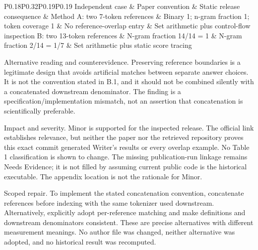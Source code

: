\documentclass[10pt]{article}
\begin{document}
P0.18P0.32P0.19P0.19 Independent case \& Paper convention \& Static release consequence \& Method
A: two 7-token references \& Binary 1; n-gram fraction 1; token coverage 1 \& No reference-overlap entry \& Set arithmetic plus control-flow inspection
B: two 13-token references \& N-gram fraction 14/14 = 1 \& N-gram fraction 2/14 = 1/7 \& Set arithmetic plus static score tracing\par
Alternative reading and counterevidence. Preserving reference boundaries is a legitimate design that avoids artificial matches between separate answer choices. It is not the convention stated in B.1, and it should not be combined silently with a concatenated downstream denominator. The finding is a specification/implementation mismatch, not an assertion that concatenation is scientifically preferable.\par
Impact and severity. Minor is supported for the inspected release. The official link establishes relevance, but neither the paper nor the retrieved repository proves this exact commit generated Writer’s results or every overlap example. No Table 1 classification is shown to change. The missing publication-run linkage remains Needs Evidence; it is not filled by assuming current public code is the historical executable. The appendix location is not the rationale for Minor.\par
Scoped repair. To implement the stated concatenation convention, concatenate references before indexing with the same tokenizer used downstream. Alternatively, explicitly adopt per-reference matching and make definitions and downstream denominators consistent. These are precise alternatives with different measurement meanings. No author file was changed, neither alternative was adopted, and no historical result was recomputed.\par
\end{document}
